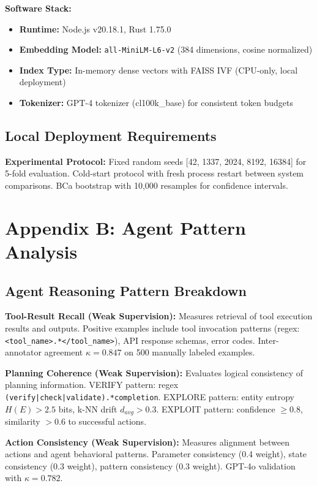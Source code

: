 \documentclass[letterpaper]{article}
\begin{document}
\textbf{Software Stack:}
\begin{itemize}
    \item \textbf{Runtime:} Node.js v20.18.1, Rust 1.75.0
    \item \textbf{Embedding Model:} \texttt{all-MiniLM-L6-v2} (384 dimensions, cosine normalized)
    \item \textbf{Index Type:} In-memory dense vectors with FAISS IVF (CPU-only, local deployment)
    \item \textbf{Tokenizer:} GPT-4 tokenizer (cl100k\_base) for consistent token budgets
\end{itemize}

\subsection{Local Deployment Requirements}

\textbf{Experimental Protocol:} Fixed random seeds [42, 1337, 2024, 8192, 16384] for 5-fold evaluation. Cold-start protocol with fresh process restart between system comparisons. BCa bootstrap with 10,000 resamples for confidence intervals.

\section{Appendix B: Agent Pattern Analysis}

\subsection{Agent Reasoning Pattern Breakdown}

\textbf{Tool-Result Recall (Weak Supervision):} Measures retrieval of tool execution results and outputs. Positive examples include tool invocation patterns (regex: \texttt{<tool\_name>.*</tool\_name>}), API response schemas, error codes. Inter-annotator agreement $\kappa = 0.847$ on 500 manually labeled examples.

\textbf{Planning Coherence (Weak Supervision):} Evaluates logical consistency of planning information. VERIFY pattern: regex \texttt{(verify|check|validate).*completion}. EXPLORE pattern: entity entropy $H(E) > 2.5$ bits, k-NN drift $d_{avg} > 0.3$. EXPLOIT pattern: confidence $\geq 0.8$, similarity $> 0.6$ to successful actions.

\textbf{Action Consistency (Weak Supervision):} Measures alignment between actions and agent behavioral patterns. Parameter consistency (0.4 weight), state consistency (0.3 weight), pattern consistency (0.3 weight). GPT-4o validation with $\kappa = 0.782$.
\end{document}
